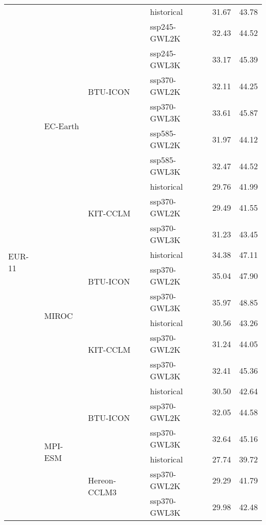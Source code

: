 \begin{table}[!htbp]
\begin{tabular}{lll|l|cc}
\midrule
\multirow{22}{*}{EUR-11} & \multirow{10}{*}{EC-Earth} & \multirow{7}{*}{BTU-ICON} & historical & 31.67 & 43.78 \\
 &  &  & ssp245-GWL2K & 32.43 & 44.52 \\
 &  &  & ssp245-GWL3K & 33.17 & 45.39 \\
 &  &  & ssp370-GWL2K & 32.11 & 44.25 \\
 &  &  & ssp370-GWL3K & 33.61 & 45.87 \\
 &  &  & ssp585-GWL2K & 31.97 & 44.12 \\
 &  &  & ssp585-GWL3K & 32.47 & 44.52 \\
\cmidrule(lr){3-6}
 &  & \multirow{3}{*}{KIT-CCLM} & historical & 29.76 & 41.99 \\
 &  &  & ssp370-GWL2K & 29.49 & 41.55 \\
 &  &  & ssp370-GWL3K & 31.23 & 43.45 \\
\cmidrule(lr){3-6}
\cmidrule(lr){2-6}
 & \multirow{6}{*}{MIROC} & \multirow{3}{*}{BTU-ICON} & historical & 34.38 & 47.11 \\
 &  &  & ssp370-GWL2K & 35.04 & 47.90 \\
 &  &  & ssp370-GWL3K & 35.97 & 48.85 \\
\cmidrule(lr){3-6}
 &  & \multirow{3}{*}{KIT-CCLM} & historical & 30.56 & 43.26 \\
 &  &  & ssp370-GWL2K & 31.24 & 44.05 \\
 &  &  & ssp370-GWL3K & 32.41 & 45.36 \\
\cmidrule(lr){3-6}
\cmidrule(lr){2-6}
 & \multirow{6}{*}{MPI-ESM} & \multirow{3}{*}{BTU-ICON} & historical & 30.50 & 42.64 \\
 &  &  & ssp370-GWL2K & 32.05 & 44.58 \\
 &  &  & ssp370-GWL3K & 32.64 & 45.16 \\
\cmidrule(lr){3-6}
 &  & \multirow{3}{*}{Hereon-CCLM3} & historical & 27.74 & 39.72 \\
 &  &  & ssp370-GWL2K & 29.29 & 41.79 \\
 &  &  & ssp370-GWL3K & 29.98 & 42.48 \\
\bottomrule
\end{tabular}
\end{table}

